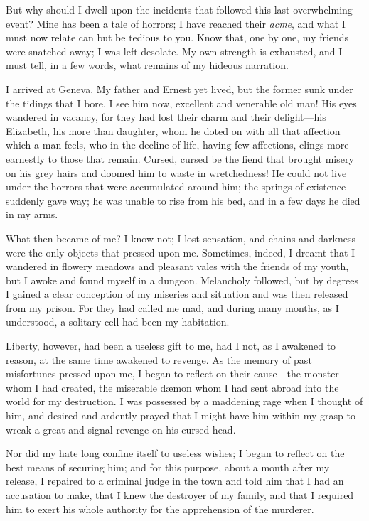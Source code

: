 \documentclass[12pt,openright]{book}
\begin{document}
But why should I dwell upon the incidents that followed this last overwhelming event? Mine has been a tale of horrors; I have reached their \textit{acme}, and what I must now relate can but be tedious to you. Know that, one by one, my friends were snatched away; I was left desolate. My own strength is exhausted, and I must tell, in a few words, what remains of my hideous narration.

I arrived at Geneva. My father and Ernest yet lived, but the former sunk under the tidings that I bore. I see him now, excellent and venerable old man! His eyes wandered in vacancy, for they had lost their charm and their delight—his Elizabeth, his more than daughter, whom he doted on with all that affection which a man feels, who in the decline of life, having few affections, clings more earnestly to those that remain. Cursed, cursed be the fiend that brought misery on his grey hairs and doomed him to waste in wretchedness! He could not live under the horrors that were accumulated around him; the springs of existence suddenly gave way; he was unable to rise from his bed, and in a few days he died in my arms.

What then became of me? I know not; I lost sensation, and chains and darkness were the only objects that pressed upon me. Sometimes, indeed, I dreamt that I wandered in flowery meadows and pleasant vales with the friends of my youth, but I awoke and found myself in a dungeon. Melancholy followed, but by degrees I gained a clear conception of my miseries and situation and was then released from my prison. For they had called me mad, and during many months, as I understood, a solitary cell had been my habitation.

Liberty, however, had been a useless gift to me, had I not, as I awakened to reason, at the same time awakened to revenge. As the memory of past misfortunes pressed upon me, I began to reflect on their cause—the monster whom I had created, the miserable dæmon whom I had sent abroad into the world for my destruction. I was possessed by a maddening rage when I thought of him, and desired and ardently prayed that I might have him within my grasp to wreak a great and signal revenge on his cursed head.

Nor did my hate long confine itself to useless wishes; I began to reflect on the best means of securing him; and for this purpose, about a month after my release, I repaired to a criminal judge in the town and told him that I had an accusation to make, that I knew the destroyer of my family, and that I required him to exert his whole authority for the apprehension of the murderer.
\end{document}
